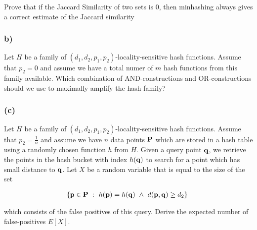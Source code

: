 \documentclass[11pt]{article}
\begin{document}
Prove that if the Jaccard Similarity of two sets is \(0\), then
minhashing always gives a correct estimate of the Jaccard similarity

\hypertarget{b}{%
\subsubsection{b)}\label{b}}

Let \(H\) be a family of \((d_1,d_2,p_1,p_2)\)-locality-sensitive hash
functions. Assume that \(p_2=0\) and assume we have a total numer of
\(m\) hash functions from this family available. Which combination of
AND-constructions and OR-constructions should we use to maximally
amplify the hash family?

\hypertarget{c}{%
\subsubsection{(c)}\label{c}}

Let \(H\) be a family of \((d_1,d_2,p_1,p_2)\)-locality-sensitive hash
functions. Assume that \(p_2=\frac{1}{n}\) and assume we have \(n\) data
points \(\bf P\) which are stored in a hash table using a randomly
chosen function \(h\) from \(H\). Given a query point \(\bf q\), we
retrieve the points in the hash bucket with index \(h(\bf q)\) to search
for a point which has small distance to \(\bf q\). Let \(X\) be a random
variable that is equal to the size of the set

\[
\begin{aligned}
\left\{{\bf p \in P}~:~ h({\bf p})=h({\bf q}) ~\wedge~ d({\bf p,q}) \geq d_2\right\}\
\end{aligned}
\]

which consists of the false positives of this query. Derive the expected
number of false-positives \(E\left[ X \right]\).


    
    
    
    
\end{document}

